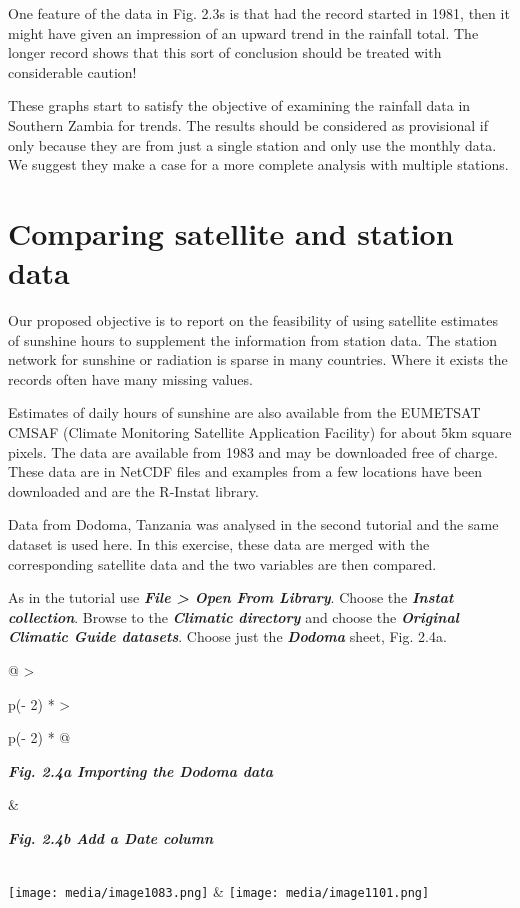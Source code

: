 \documentclass[
  letterpaper,
  DIV=11,
  numbers=noendperiod]{scrreprt}
\begin{document}
One feature of the data in Fig. 2.3s is that had the record started in
1981, then it might have given an impression of an upward trend in the
rainfall total. The longer record shows that this sort of conclusion
should be treated with considerable caution!

These graphs start to satisfy the objective of examining the rainfall
data in Southern Zambia for trends. The results should be considered as
provisional if only because they are from just a single station and only
use the monthly data. We suggest they make a case for a more complete
analysis with multiple stations.

\section{Comparing satellite and station
data}\label{comparing-satellite-and-station-data}

Our proposed objective is to report on the feasibility of using
satellite estimates of sunshine hours to supplement the information from
station data. The station network for sunshine or radiation is sparse in
many countries. Where it exists the records often have many missing
values.

Estimates of daily hours of sunshine are also available from the
EUMETSAT CMSAF (Climate Monitoring Satellite Application Facility) for
about 5km square pixels. The data are available from 1983 and may be
downloaded free of charge. These data are in NetCDF files and examples
from a few locations have been downloaded and are the R-Instat library.

Data from Dodoma, Tanzania was analysed in the second tutorial and the
same dataset is used here. In this exercise, these data are merged with
the corresponding satellite data and the two variables are then
compared.

As in the tutorial use \textbf{\emph{File \textgreater{} Open From
Library}}. Choose the \textbf{\emph{Instat collection}}. Browse to the
\textbf{\emph{Climatic directory}} and choose the \textbf{\emph{Original
Climatic Guide datasets}}. Choose just the \textbf{\emph{Dodoma}} sheet,
Fig. 2.4a.

\begin{longtable}[]{@{}
  >{\raggedright\arraybackslash}p{(\columnwidth - 2\tabcolsep) * }
  >{\raggedright\arraybackslash}p{(\columnwidth - 2\tabcolsep) * }@{}}
\toprule\noalign{}
\begin{minipage}[b]{\linewidth}\raggedright
\textbf{\emph{Fig. 2.4a Importing the Dodoma data}}
\end{minipage} & \begin{minipage}[b]{\linewidth}\raggedright
\textbf{\emph{Fig. 2.4b Add a Date column}}
\end{minipage} \\
\midrule\noalign{}
\endhead
\bottomrule\noalign{}
\endlastfoot
\texttt{[image: media/image1083.png]} &
\texttt{[image: media/image1101.png]} \\
\end{longtable}
\end{document}
